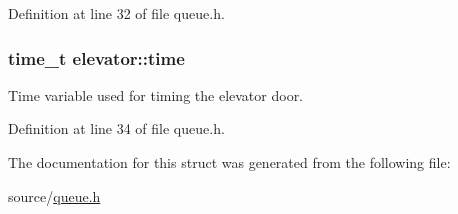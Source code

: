 Definition at line 32 of file queue.\+h.

\subsubsection[{\texorpdfstring{time}{time}}]{\setlength{\rightskip}{0pt plus 5cm}time\+\_\+t elevator\+::time}\hypertarget{structelevator_a7b0a2985b5ee51234ebe3b395d960921}{}\label{structelevator_a7b0a2985b5ee51234ebe3b395d960921}
Time variable used for timing the elevator door. 

Definition at line 34 of file queue.\+h.



The documentation for this struct was generated from the following file\+:\begin{DoxyCompactItemize}
\item 
source/\hyperlink{queue_8h}{queue.\+h}\end{DoxyCompactItemize}
